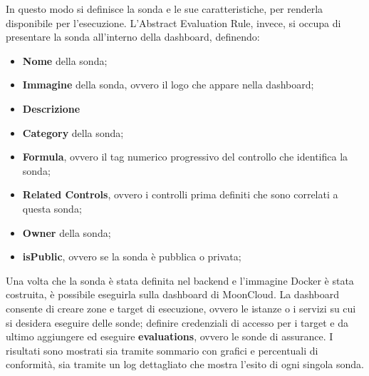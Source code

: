 In questo modo si definisce la sonda e le sue caratteristiche, per renderla disponibile per l'esecuzione. L'Abstract Evaluation Rule, invece, si occupa di presentare la sonda all'interno della dashboard, definendo:

\begin{itemize}
    \item \textbf{Nome} della sonda;
    \item \textbf{Immagine} della sonda, ovvero il logo che appare nella dashboard;
    \item \textbf{Descrizione}
    \item \textbf{Category} della sonda;
    \item \textbf{Formula}, ovvero il tag numerico progressivo del controllo che identifica la sonda;
    \item \textbf{Related Controls}, ovvero i controlli prima definiti che sono correlati a questa sonda;
    \item \textbf{Owner} della sonda;
    \item \textbf{isPublic}, ovvero se la sonda è pubblica o privata;
\end{itemize}

Una volta che la sonda è stata definita nel backend e l'immagine Docker è stata costruita, è possibile eseguirla sulla dashboard di MoonCloud. La dashboard consente di creare zone e target di esecuzione, ovvero le istanze o i servizi su cui si desidera eseguire delle sonde; definire credenziali di accesso per i target e da ultimo aggiungere ed eseguire \textbf{evaluations}, ovvero le sonde di assurance. I risultati sono mostrati sia tramite sommario con grafici e percentuali di conformità, sia tramite un log dettagliato che mostra l'esito di ogni singola sonda. 